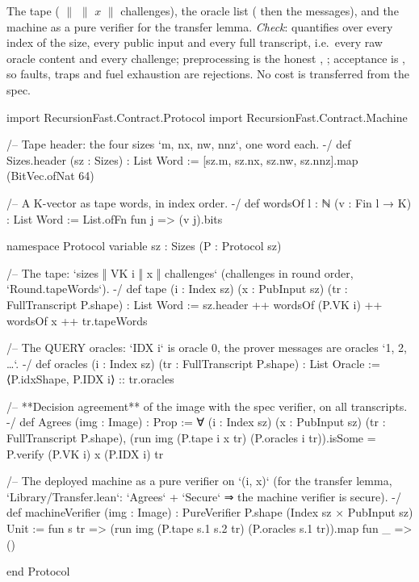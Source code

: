 The tape ( $\|$  $\|$ $x$ $\|$ challenges), the oracle list (
then the messages),  and the machine as a pure verifier for the transfer lemma.
\emph{Check}:  quantifies over every index of the size, every public input and every
full transcript, i.e.\ every raw oracle content and every challenge; preprocessing is the honest
, ; acceptance is , so faults, traps and fuel exhaustion are
rejections. No cost is transferred from the spec.

\begin{leancode}[fontsize=\scriptsize,label={\footnotesize Contract/Agrees.lean}]
import RecursionFast.Contract.Protocol
import RecursionFast.Contract.Machine

/-- Tape header: the four sizes `m, nx, nw, nnz`, one word each. -/
def Sizes.header (sz : Sizes) : List Word := [sz.m, sz.nx, sz.nw, sz.nnz].map (BitVec.ofNat 64)

/-- A K-vector as tape words, in index order. -/
def wordsOf {l : ℕ} (v : Fin l → K) : List Word := List.ofFn fun j => (v j).bits

namespace Protocol
variable {sz : Sizes} (P : Protocol sz)

/-- The tape: `sizes ‖ VK i ‖ x ‖ challenges` (challenges in round order, `Round.tapeWords`). -/
def tape (i : Index sz) (x : PubInput sz) (tr : FullTranscript P.shape) : List Word :=
  sz.header ++ wordsOf (P.VK i) ++ wordsOf x ++ tr.tapeWords

/-- The QUERY oracles: `IDX i` is oracle 0, the prover messages are oracles `1, 2, …`. -/
def oracles (i : Index sz) (tr : FullTranscript P.shape) : List Oracle :=
  ⟨P.idxShape, P.IDX i⟩ :: tr.oracles

/-- **Decision agreement** of the image with the spec verifier, on all transcripts. -/
def Agrees (img : Image) : Prop :=
  ∀ (i : Index sz) (x : PubInput sz) (tr : FullTranscript P.shape),
    (run img (P.tape i x tr) (P.oracles i tr)).isSome = P.verify (P.VK i) x (P.IDX i) tr

/-- The deployed machine as a pure verifier on `(i, x)` (for the transfer lemma,
`Library/Transfer.lean`: `Agrees` + `Secure` ⇒ the machine verifier is secure). -/
def machineVerifier (img : Image) : PureVerifier P.shape (Index sz × PubInput sz) Unit :=
  fun s tr => (run img (P.tape s.1 s.2 tr) (P.oracles s.1 tr)).map fun _ => ()

end Protocol
\end{leancode}

